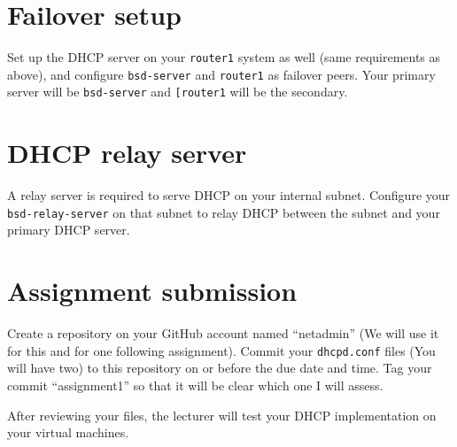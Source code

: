 \documentclass{article}
\begin{document}
\section{Failover setup}
Set up the DHCP server on your \texttt{router1} system as well (same requirements as above), and configure \texttt{bsd-server} and \texttt{router1} as failover peers.  Your primary server will be \texttt{bsd-server} and \texttt{[router1} will be the secondary.


\section{DHCP relay server}
A relay server is required to serve DHCP on your internal subnet.  Configure your \texttt{bsd-relay-server} on that subnet to relay DHCP between the subnet and your primary DHCP server.

\section{Assignment submission}
Create a repository on your GitHub account named ``netadmin'' (We will use it for this and for one following assignment).  Commit your \texttt{dhcpd.conf} files (You will have two) to this repository on or before the due date and time.  Tag your commit ``assignment1'' so that it will be clear which one I will assess.

After reviewing your files, the lecturer will test your DHCP implementation on your virtual machines.
\end{document}
